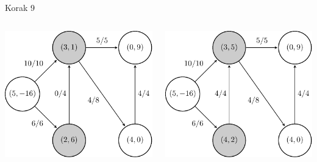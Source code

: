 \documentclass{beamer}
\begin{document}
\begin{frame}{Korak 9}
    \begin{columns}
        \begin{column}{0.5\textwidth}
            \centering
            \includegraphics[scale=0.7]{../writing/images/graf2-10.pdf}
        \end{column}
        \pause
        \begin{column}{0.5\textwidth}
            \centering
            \includegraphics[scale=0.7]{../writing/images/graf2-11.pdf}
        \end{column}
    \end{columns}
\end{frame}
\end{document}
